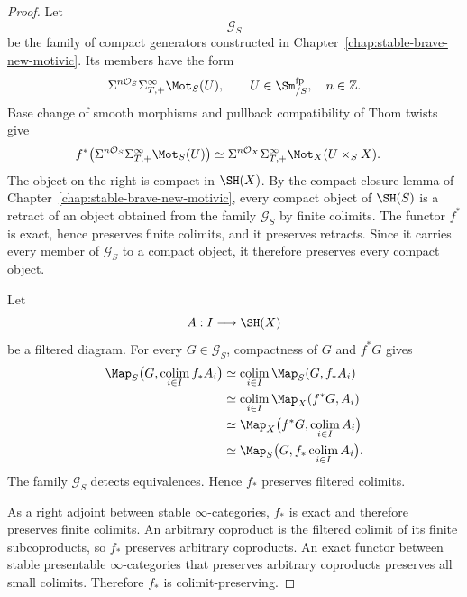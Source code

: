 \begin{proof}
Let
\[
    \mathcal G_S
\]
be the family of compact generators constructed in
Chapter~\ref{chap:stable-brave-new-motivic}.  Its members have the form
\[
    \Sigma^{n\mathcal O_S}
    \Sigma_{T,+}^{\infty}\Mot_S(U),
    \qquad
    U\in\Sm^{\mathrm{fp}}_{/S},
    \quad
    n\in\mathbb Z.
\]
Base change of smooth morphisms and pullback compatibility of Thom twists
give
\[
\begin{aligned}
    f^*
    \bigl(
      \Sigma^{n\mathcal O_S}
      \Sigma_{T,+}^{\infty}\Mot_S(U)
    \bigr)
    &\simeq
    \Sigma^{n\mathcal O_X}
    \Sigma_{T,+}^{\infty}
    \Mot_X(U\times_SX).
\end{aligned}
\]
The object on the right is compact in \(\SH(X)\).  By the compact-closure
lemma of Chapter~\ref{chap:stable-brave-new-motivic}, every compact object of
\(\SH(S)\) is a retract of an object obtained from the family
\(\mathcal G_S\) by finite colimits.  The functor \(f^*\) is exact, hence
preserves finite colimits, and it preserves retracts.  Since it carries every
member of \(\mathcal G_S\) to a compact object, it therefore preserves every
compact object.

Let
\[
    A:I\longrightarrow\SH(X)
\]
be a filtered diagram.  For every \(G\in\mathcal G_S\), compactness of
\(G\) and \(f^*G\) gives
\[
\begin{aligned}
    \Map_S
    \bigl(
      G,
      \operatorname*{colim}_{i\in I}f_*A_i
    \bigr)
    &\simeq
    \operatorname*{colim}_{i\in I}
    \Map_S(G,f_*A_i) \\
    &\simeq
    \operatorname*{colim}_{i\in I}
    \Map_X(f^*G,A_i) \\
    &\simeq
    \Map_X
    \bigl(
      f^*G,
      \operatorname*{colim}_{i\in I}A_i
    \bigr) \\
    &\simeq
    \Map_S
    \bigl(
      G,
      f_*\operatorname*{colim}_{i\in I}A_i
    \bigr).
\end{aligned}
\]
The family \(\mathcal G_S\) detects equivalences.  Hence \(f_*\) preserves
filtered colimits.

As a right adjoint between stable \(\infty\)-categories, \(f_*\) is exact
and therefore preserves finite colimits.  An arbitrary coproduct is the
filtered colimit of its finite subcoproducts, so \(f_*\) preserves arbitrary
coproducts.  An exact functor between stable presentable
\(\infty\)-categories that preserves arbitrary coproducts preserves all
small colimits.  Therefore \(f_*\) is colimit-preserving.
\end{proof}

